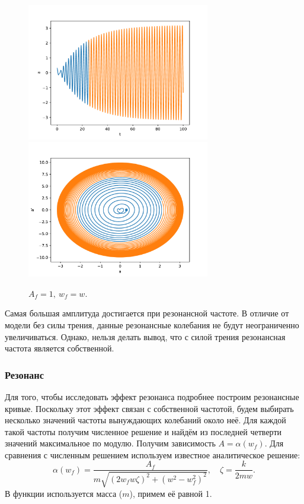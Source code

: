             \begin{figure}[H]
                \centering
                \includegraphics[width=8cm]{pictures/5resonance3.pdf}
                \includegraphics[width=8cm]{pictures/5resonance3p.pdf}
                \caption{$A_f = 1, ~ w_f = w$.}
            \end{figure}
            Самая большая амплитуда достигается при резонансной частоте. В отличие от модели без силы трения, данные резонансные колебания не будут неограниченно увеличиваться. Однако, нельзя делать вывод, что с силой трения резонансная частота является собственной.

        \subsubsection{Резонанс}
            Для того, чтобы исследовать эффект резонанса подробнее построим резонансные кривые. Поскольку этот эффект связан с собственной частотой, будем выбирать несколько значений частоты вынуждающих колебаний около неё. Для каждой такой частоты получим численное решение и найдём из последней четверти значений максимальное по модулю. Получим зависимость \( A = \alpha (w_f) \). Для сравнения с численным решением используем известное аналитическое решение:
            \[
                \alpha (w_f) = \frac{A_f}{m\sqrt{ \left( 2 w_f w \zeta \right)^2 + \left( w^2 - w_f^2 \right)^2 }}, \quad \zeta = \frac{k}{2 m w}.
            \]
            В функции используется масса (\( m \)), примем её равной 1.

